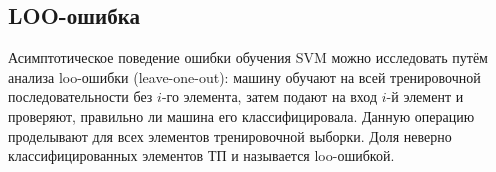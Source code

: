\documentclass[14pt,a4paper,article]{ncc}
\numberwithin{equation}{subsection}
\begin{document}
\subsection{LOO-ошибка}

Асимптотическое поведение ошибки обучения SVM можно исследовать путём анализа loo-ошибки (leave-one-out): машину обучают на всей тренировочной последовательности без $i$-го элемента, затем подают на вход $i$-й элемент и проверяют, правильно ли машина его классифицировала. Данную операцию проделывают для всех элементов тренировочной выборки. Доля неверно классифицированных элементов ТП и называется loo-ошибкой.

\printbibliography
\end{document}
